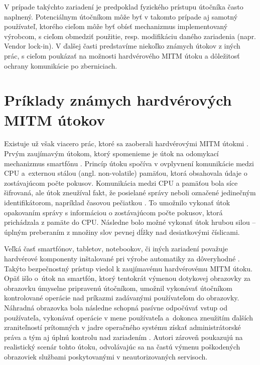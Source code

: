 V prípade takýchto zariadení je predpoklad fyzického prístupu útočníka často naplnený. Potenciálnym útočníkom môže byť v takomto prípade aj samotný používateľ, ktorého cieľom môže byť obísť mechanizmus implementovaný výrobcom, s cieľom obmedziť použitie, resp. modifikáciu daného zariadenia (napr. Vendor lock-in). V ďalšej časti predstavíme niekoľko známych útokov z iných prác, s cieľom poukázať na možnosti hardvérového MITM útoku a dôležitosť ochrany komunikácie po zberniciach.

\section{Príklady známych hardvérových MITM útokov}
Existuje už však viacero prác, ktoré sa zaoberali hardvérovými MITM útokmi \cite{mitmSmartphone, mitmTouch, mitmTPM, mitmBitlocker, mitmI2C}. Prvým zaujímavým útokom, ktorý spomenieme je útok na odomykací mechanizmus smartfónu \cite{mitmSmartphone}. Princíp útoku spočíva v ovplyvnení komunikácie medzi CPU a~externou stálou (angl. non-volatile) pamäťou, ktorá obsahovala údaje o zostávajúcom počte pokusov. Komunikácia medzi CPU a pamäťou bola síce šifrovaná, ale útok zneužíval fakt, že posielané správy neboli označené jedinečným identifikátorom, napríklad časovou pečiatkou \cite{mitmSmartphone}. To umožnilo vykonať útok opakovaním správy s informáciou o zostávajúcom počte pokusov, ktorá prichádzala z pamäte do CPU. Následne bolo možné vykonať útok hrubou silou -- úplným preberaním z množiny slov pevnej dĺžky nad desiatkovými číslicami.

Veľká časť smartfónov, tabletov, notebookov, či iných zariadení považuje hardvérové komponenty inštalované pri výrobe automatiky za dôveryhodné \cite{mitmTouch}. Takýto bezpečnostný prístup viedol k zaujímavému hardvérovému MITM útoku. Opäť išlo o~útok na smartfón, ktorý tentokrát výmenou dotykovej obrazovky za obrazovku úmyselne pripravenú útočníkom, umožnil vykonávať útočníkom kontrolované operácie nad príkazmi zadávanými používateľom do obrazovky. Náhradná obrazovka bola následne schopná pasívne odpočúvať vstup od používateľa, vykonávať operácie v mene používateľa a~dokonca zneužitím ďalších zraniteľností prítomných v jadre operačného systému získať administrátorské práva a tým aj úplnú kontrolu nad zariadením \cite{mitmTouch}. Autori zároveň poukazujú na realistický scenár tohto útoku, odvolávajúc sa na častú výmenu poškodených obrazoviek službami poskytovanými v neautorizovaných servisoch.


